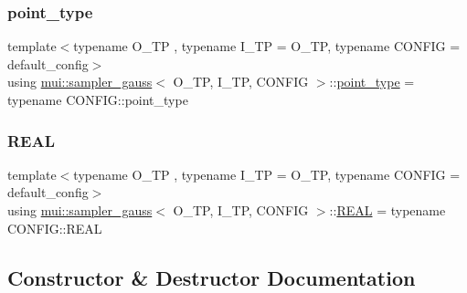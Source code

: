 \mbox{\label{classmui_1_1sampler__gauss_aeae4228a569ecea463221e54dade2bcc}} 
\subsubsection{\texorpdfstring{point\+\_\+type}{point\_type}}
{\footnotesize\ttfamily template$<$typename O\+\_\+\+TP , typename I\+\_\+\+TP  = O\+\_\+\+TP, typename C\+O\+N\+F\+IG  = default\+\_\+config$>$ \\
using \hyperlink{classmui_1_1sampler__gauss}{mui\+::sampler\+\_\+gauss}$<$ O\+\_\+\+TP, I\+\_\+\+TP, C\+O\+N\+F\+IG $>$\+::\hyperlink{classmui_1_1sampler__gauss_aeae4228a569ecea463221e54dade2bcc}{point\+\_\+type} =  typename C\+O\+N\+F\+I\+G\+::point\+\_\+type}

\mbox{\label{classmui_1_1sampler__gauss_a35a01ac5eb1f9f41dc5642844a43366b}} 
\subsubsection{\texorpdfstring{R\+E\+AL}{REAL}}
{\footnotesize\ttfamily template$<$typename O\+\_\+\+TP , typename I\+\_\+\+TP  = O\+\_\+\+TP, typename C\+O\+N\+F\+IG  = default\+\_\+config$>$ \\
using \hyperlink{classmui_1_1sampler__gauss}{mui\+::sampler\+\_\+gauss}$<$ O\+\_\+\+TP, I\+\_\+\+TP, C\+O\+N\+F\+IG $>$\+::\hyperlink{classmui_1_1sampler__gauss_a35a01ac5eb1f9f41dc5642844a43366b}{R\+E\+AL} =  typename C\+O\+N\+F\+I\+G\+::\+R\+E\+AL}



\subsection{Constructor \& Destructor Documentation}
\mbox{\label{classmui_1_1sampler__gauss_a692ea2ab45685ce8c9b7b0355ef401ed}} 
